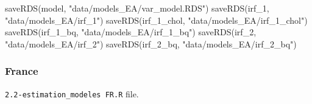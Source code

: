 \documentclass[
  11pt,
]{article}
\newenvironment{Shaded}{\begin{snugshade}}{\end{snugshade}}
\newcommand{\FunctionTok}[1]{\textcolor[rgb]{0.00,0.00,0.00}{#1}}
\newcommand{\NormalTok}[1]{#1}
\newcommand{\StringTok}[1]{\textcolor[rgb]{0.31,0.60,0.02}{#1}}
\begin{document}
\begin{Shaded}
\begin{Highlighting}[]
\FunctionTok{saveRDS}\NormalTok{(model, }\StringTok{"data/models\_EA/var\_model.RDS"}\NormalTok{)}
\FunctionTok{saveRDS}\NormalTok{(irf\_1, }\StringTok{"data/models\_EA/irf\_1"}\NormalTok{)}
\FunctionTok{saveRDS}\NormalTok{(irf\_1\_chol, }\StringTok{"data/models\_EA/irf\_1\_chol"}\NormalTok{)}
\FunctionTok{saveRDS}\NormalTok{(irf\_1\_bq, }\StringTok{"data/models\_EA/irf\_1\_bq"}\NormalTok{)}
\FunctionTok{saveRDS}\NormalTok{(irf\_2, }\StringTok{"data/models\_EA/irf\_2"}\NormalTok{)}
\FunctionTok{saveRDS}\NormalTok{(irf\_2\_bq, }\StringTok{"data/models\_EA/irf\_2\_bq"}\NormalTok{)}
\end{Highlighting}
\end{Shaded}

\hypertarget{france}{%
\subsubsection{France}\label{france}}

\texttt{2.2-estimation\_modeles\ FR.R} file.
\end{document}
